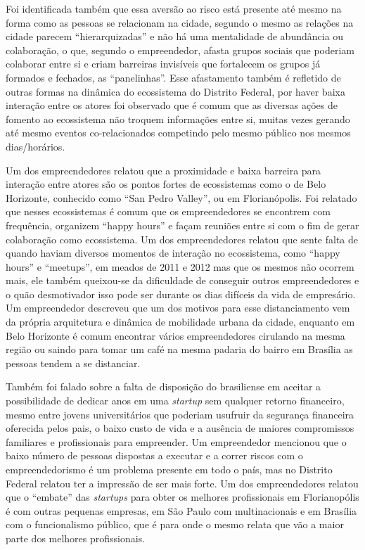 Foi identificada também que essa aversão ao risco está presente até mesmo na forma como as pessoas se relacionam na cidade, segundo o mesmo as relações na cidade parecem ``hierarquizadas'' e não há uma mentalidade de abundância ou colaboração, o que, segundo o empreendedor, afasta grupos sociais que poderiam colaborar entre si e criam barreiras invisíveis que fortalecem os grupos já formados e fechados, as ``panelinhas''. Esse afastamento também é refletido de outras formas na dinâmica do ecossistema do Distrito Federal, por haver baixa interação entre os atores foi observado que é comum que as diversas ações de fomento ao ecossistema não troquem informações entre si, muitas vezes gerando até mesmo eventos co-relacionados competindo pelo mesmo público nos mesmos dias/horários.

Um dos empreendedores relatou que a proximidade e baixa barreira para interação entre atores são os pontos fortes de ecossistemas como o de Belo Horizonte, conhecido como ``San Pedro Valley'', ou em Florianópolis. Foi relatado que nesses ecossistemas é comum que os empreendedores se encontrem com frequência, organizem ``happy hours'' e façam reuniões entre si com o fim de gerar colaboração como ecossistema. Um dos empreendedores relatou que sente falta de quando haviam diversos momentos de interação no ecossistema, como ``happy hours'' e ``meetups'', em meados de 2011 e 2012 mas que os mesmos não ocorrem mais, ele também queixou-se da dificuldade de conseguir outros empreendedores e o quão desmotivador isso pode ser durante os dias difíceis da vida de empresário. Um empreendedor descreveu que um dos motivos para esse distanciamento vem da própria arquitetura e dinâmica de mobilidade urbana da cidade, enquanto em Belo Horizonte é comum encontrar vários empreendedores cirulando na mesma região ou saindo para tomar um café na mesma padaria do bairro em Brasília as pessoas tendem a se distanciar.

Também foi falado sobre a falta de disposição do brasiliense em aceitar a possibilidade de dedicar anos em uma \textit{startup} sem qualquer retorno financeiro, mesmo entre jovens universitários que poderiam usufruir da segurança financeira oferecida pelos pais, o baixo custo de vida e a ausência de maiores compromissos familiares e profissionais para empreender. Um empreendedor mencionou que o baixo número de pessoas dispostas a executar e a correr riscos com o empreendedorismo é um problema presente em todo o país, mas no Distrito Federal relatou ter a impressão de ser mais forte. Um dos empreendedores relatou que o ``embate'' das \textit{startups} para obter os melhores profissionais em Florianopólis é com outras pequenas empresas, em São Paulo com multinacionais e em Brasília com o funcionalismo público, que é para onde o mesmo relata que vão a maior parte dos melhores profissionais.

